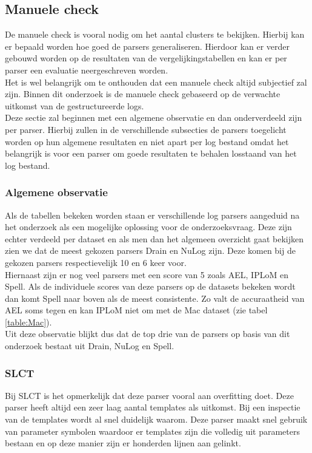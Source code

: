 \subsection{Manuele check}
De manuele check is vooral nodig om het aantal clusters te bekijken. Hierbij kan er bepaald worden hoe goed de parsers generaliseren. Hierdoor kan er verder gebouwd worden op de resultaten van de vergelijkingstabellen en kan er per parser een evaluatie neergeschreven worden.\\

Het is wel belangrijk om te onthouden dat een manuele check altijd subjectief zal zijn. Binnen dit onderzoek is de manuele check gebaseerd op de verwachte uitkomst van de gestructureerde logs.\\

Deze sectie zal beginnen met een algemene observatie en dan onderverdeeld zijn per parser. Hierbij zullen in de verschillende subsecties de parsers toegelicht worden op hun algemene resultaten en niet apart per log bestand omdat het belangrijk is voor een parser om goede resultaten te behalen losstaand van het log bestand.

\subsubsection{Algemene observatie}
Als de tabellen bekeken worden staan er verschillende log parsers aangeduid na het onderzoek als een mogelijke oplossing voor de onderzoeksvraag. Deze zijn echter verdeeld per dataset en als men dan het algemeen overzicht gaat bekijken zien we dat de meest gekozen parsers Drain en NuLog zijn. Deze komen bij de gekozen parsers respectievelijk 10 en 6 keer voor.\\

Hiernaast zijn er nog veel parsers met een score van 5 zoals AEL, IPLoM en Spell. Als de individuele scores van deze parsers op de datasets bekeken wordt dan komt Spell naar boven als de meest consistente. Zo valt de accuraatheid van AEL soms tegen en kan IPLoM niet om met de Mac dataset (zie tabel \ref{table:Mac}).\\

Uit deze observatie blijkt dus dat de top drie van de parsers op basis van dit onderzoek bestaat uit Drain, NuLog en Spell.

\subsubsection{SLCT}
Bij SLCT is het opmerkelijk dat deze parser vooral aan overfitting doet. Deze parser heeft altijd een zeer laag aantal templates als uitkomst. Bij een inspectie van de templates wordt al snel duidelijk waarom. Deze parser maakt snel gebruik van parameter symbolen waardoor er templates zijn die volledig uit parameters bestaan en op deze manier zijn er honderden lijnen aan gelinkt.\\

